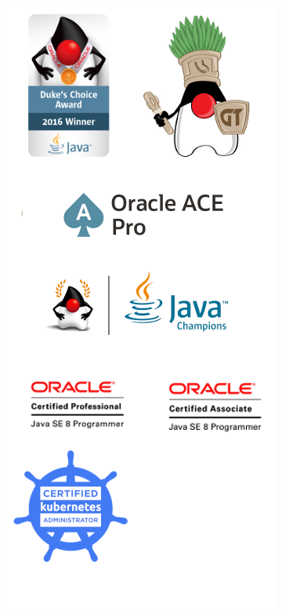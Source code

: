 \documentclass[aspectratio=169]{beamer}
\begin{document}
\begin{frame}
    \begin{columns}[T] %

        \begin{column}[T]{4cm} %
            \begin{figure}
                \centering
                \includegraphics[width=\linewidth]{Images/logos}

\end{figure}
\end{column}
\end{columns}
\end{frame}
\end{document}
